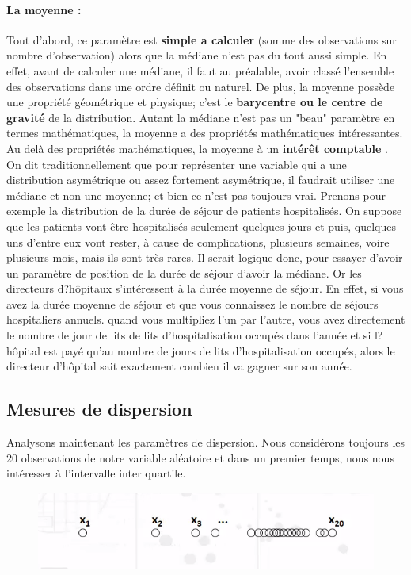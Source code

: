 \paragraph{La moyenne : } Tout d'abord, ce paramètre est \textbf{simple a calculer} (somme des observations sur nombre d'observation) alors que la médiane n'est pas du tout aussi simple. En effet, avant de calculer une médiane, il faut au préalable, avoir classé l'ensemble des observations dans une ordre définit ou naturel.\newline
De plus, la moyenne possède une propriété géométrique et physique; c'est le \textbf{barycentre ou le centre de gravité} de la distribution.\newline
Autant la médiane n'est pas un "beau" paramètre en termes mathématiques, la moyenne a des propriétés mathématiques intéressantes.	\newline
Au delà des propriétés mathématiques, la moyenne à un \textbf{intérêt comptable} . On dit traditionnellement que pour représenter une variable qui a une distribution asymétrique ou assez fortement asymétrique, il faudrait utiliser une médiane et non une moyenne; et bien ce n'est pas toujours vrai. Prenons pour exemple la distribution de la durée de séjour de patients hospitalisés. On suppose que les patients vont être hospitalisés seulement quelques jours et puis, quelques-uns d'entre eux vont rester, à cause de complications, plusieurs semaines, voire plusieurs mois, mais ils sont très rares. Il serait logique donc, pour essayer d'avoir un paramètre de position de la durée de séjour d'avoir la médiane. Or les directeurs d?hôpitaux s'intéressent à la durée moyenne de séjour. En effet, si vous avez la durée moyenne de séjour et que vous connaissez le nombre de séjours hospitaliers annuels. quand vous multipliez l'un par l'autre, vous avez directement le nombre de jour de lits de lits d'hospitalisation occupés dans l'année et si l?hôpital est payé qu'au nombre de jours de lits d'hospitalisation occupés, alors le directeur d'hôpital sait exactement combien il va gagner sur son année.
\subsection{Mesures de dispersion}
Analysons maintenant les paramètres de dispersion. \newline
Nous considérons toujours les 20 observations de notre variable aléatoire
et dans un premier temps, nous nous intéresser à l'intervalle inter quartile.
\begin{figure}[H]\begin{center}\includegraphics[scale=0.5]{ilu/g4.png}\end{center}\end{figure}
